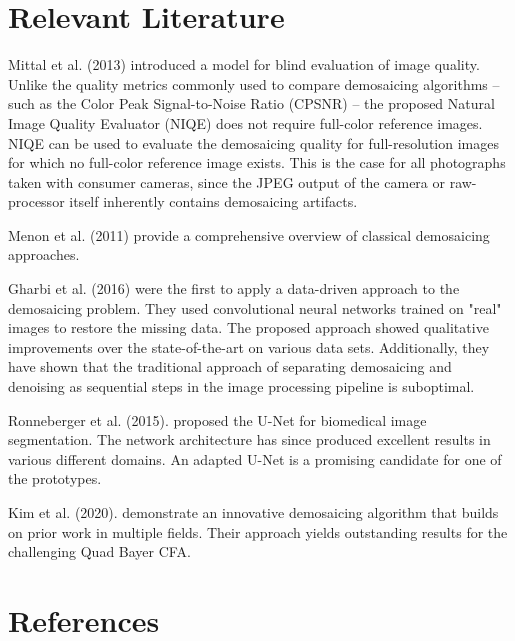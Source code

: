 \documentclass[english,notitlepage,smartquotes]{hgbreport}
\begin{document}
\section{Relevant Literature}

Mittal et al. (2013) \cite{Mittal2013} introduced a model for blind evaluation of image quality. Unlike the quality metrics commonly used to compare demosaicing algorithms -- such as the Color Peak Signal-to-Noise Ratio (CPSNR) \cite{Menon2011} -- the proposed Natural Image Quality Evaluator (NIQE) does not require full-color reference images. NIQE can be used to evaluate the demosaicing quality for full-resolution images for which no full-color reference image exists. This is the case for all photographs taken with consumer cameras, since the JPEG output of the camera or raw-processor itself inherently contains demosaicing artifacts.

Menon et al. (2011) \cite{Menon2011} provide a comprehensive overview of classical demosaicing approaches.

Gharbi et al. (2016) \cite{Gharbi2016} were the first to apply a data-driven approach to the demosaicing problem. They used convolutional neural networks trained on "real" images to restore the missing data. The proposed approach showed qualitative improvements over the state-of-the-art on various data sets. Additionally, they have shown that the traditional approach of separating demosaicing and denoising as sequential steps in the image processing pipeline is suboptimal.

Ronneberger et al. (2015). \cite{Ronneberger2015} proposed the U-Net for biomedical image segmentation. The network architecture has since produced excellent results in various different domains. An adapted U-Net is a promising candidate for one of the prototypes.

Kim et al. (2020). \cite{Kim2020} demonstrate an innovative demosaicing algorithm that builds on prior work in multiple fields. Their approach yields outstanding results for the challenging Quad Bayer CFA.

  
\section*{References}

\printbibliography[heading=noheader]

\end{document}
